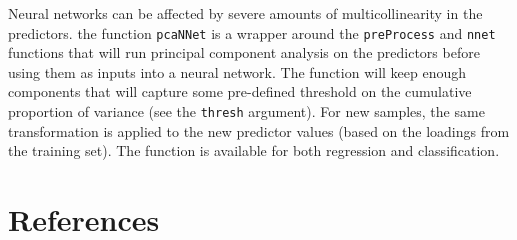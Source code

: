 \documentclass[12pt]{article}
\begin{document}
Neural networks can be affected by severe amounts of multicollinearity in the predictors. the function \texttt{pcaNNet} is a wrapper around the \texttt{preProcess} and \texttt{nnet} functions that will run principal component analysis on the predictors before using them as inputs into a neural network. The function will keep enough components that will capture some pre-defined threshold on the cumulative proportion of variance (see the \texttt{thresh} argument). For new samples, the same transformation is applied to the new predictor values (based on the loadings from the training set). The function is available for both regression and classification. 

\section{References}
\end{document}
